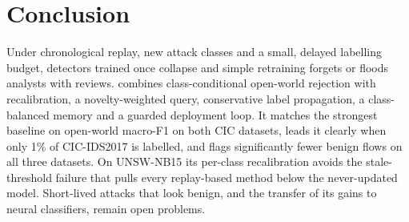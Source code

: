 \section{Conclusion}
\label{sec:conclusion}

Under chronological replay, new attack classes and a small, delayed labelling budget, detectors trained once
collapse and simple retraining forgets or floods analysts with reviews. \nova{} combines class-conditional
open-world rejection with recalibration, a novelty-weighted query, conservative label propagation, a
class-balanced memory and a guarded deployment loop. It matches the strongest baseline on open-world macro-F1 on
both CIC datasets, leads it clearly when only 1\% of CIC-IDS2017 is labelled, and flags significantly fewer benign
flows on all three datasets. On UNSW-NB15 its per-class recalibration avoids the stale-threshold failure that
pulls every replay-based method below the never-updated model. Short-lived attacks that look benign, and the
transfer of its gains to neural classifiers, remain open problems.

